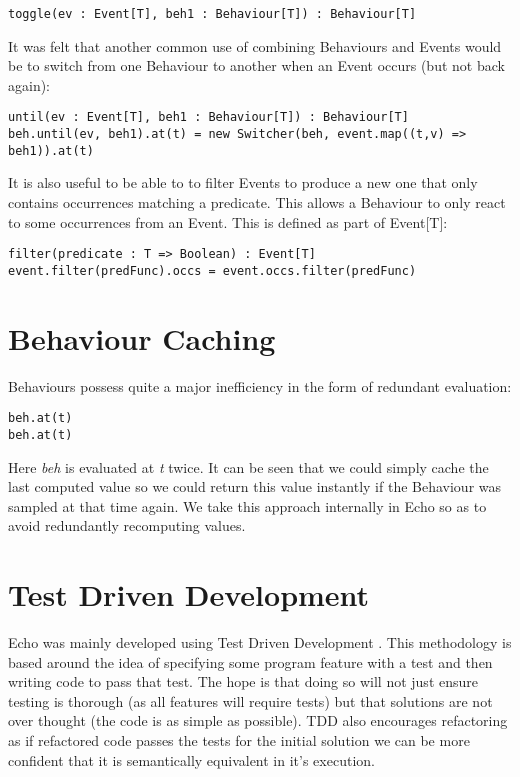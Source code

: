 \begin{verbatim}
toggle(ev : Event[T], beh1 : Behaviour[T]) : Behaviour[T]
\end{verbatim}        
    
    It was felt that another common use of combining Behaviours and Events would be
    to switch from one Behaviour to another when an Event occurs (but not back again):

\begin{verbatim}
until(ev : Event[T], beh1 : Behaviour[T]) : Behaviour[T]
beh.until(ev, beh1).at(t) = new Switcher(beh, event.map((t,v) => beh1)).at(t)
\end{verbatim}        
    
    It is also useful to be able to to filter Events to produce a new one that only
    contains occurrences matching a predicate. This allows a Behaviour to only react
    to some occurrences from an Event. This is defined as part of Event[T]:

\begin{verbatim}
filter(predicate : T => Boolean) : Event[T]
event.filter(predFunc).occs = event.occs.filter(predFunc)
\end{verbatim}  

  \section{Behaviour Caching}
    Behaviours possess quite a major inefficiency in the form of redundant evaluation:

\begin{verbatim}
beh.at(t)
beh.at(t)
\end{verbatim}  

    Here \emph{beh} is evaluated at \emph{t} twice. It can be seen that we could simply cache the last
    computed value so we could return this value instantly if the Behaviour was sampled at that time again.
    We take this approach internally in Echo so as to avoid redundantly recomputing values. 
  
  \section{Test Driven Development}
    Echo was mainly developed using Test Driven Development \cite{Cunningham}. This methodology is based around the idea
    of specifying some program feature with a test and then writing code to pass that test. The hope
    is that doing so will not just ensure testing is thorough (as all features will require tests) but
    that solutions are not over thought (the code is as simple as possible). TDD also encourages
    refactoring as if refactored code passes the tests for the initial solution we can be more confident
    that it is semantically equivalent in it's execution.

